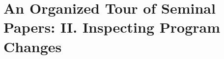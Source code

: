 \documentclass[runningheads,a4paper]{llncs}
\begin{document}
\section{An Organized Tour of Seminal Papers: II. Inspecting Program Changes}
\label{sec:inspect}

\end{document}

